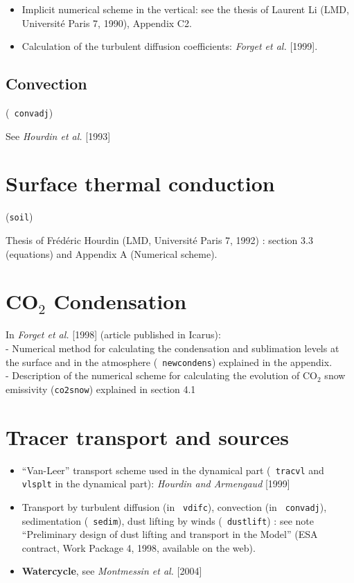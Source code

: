 \begin{itemize}
\item Implicit numerical scheme in the vertical:
see the thesis of Laurent Li (LMD, Universit\'e Paris 7, 1990), Appendix C2.

\item Calculation of the turbulent diffusion coefficients:
{\it Forget et al. } [1999].
\end{itemize}

\subsection{Convection}
 (\verb+ convadj+)

See {\it Hourdin et al.} [1993]
\nocite{Hour:93}

\section{Surface thermal conduction}
 (\verb+soil+)

Thesis of Fr\'ed\'eric Hourdin (LMD, Universit\'e Paris 7, 1992) :
 section 3.3 (equations) and Appendix A (Numerical scheme).

\section{CO$_2$ Condensation}

In {\it Forget et al.} [1998] (article published in Icarus): \\
- Numerical method for calculating the condensation and sublimation levels
at the surface and in the atmosphere (\verb+ newcondens+)
 explained in the appendix.
\\
- Description of the numerical scheme for calculating the evolution of CO$_2$
snow emissivity (\verb+co2snow+) explained in section 4.1
\nocite{Forg:98}

\section{Tracer transport and sources}
\begin{itemize}
\item ``Van-Leer'' transport scheme used in the dynamical part
(\verb+ tracvl+ and  \verb+ vlsplt+ in the dynamical part):
{\it Hourdin and Armengaud} [1999] \nocite{Hour:99}

\item Transport by turbulent diffusion  (in \verb+ vdifc+), convection
(in  \verb+ convadj+), sedimentation  (\verb+ sedim+),
dust lifting by winds (\verb+ dustlift+) :
see note ``Preliminary design of dust lifting and transport in the Model''
(ESA contract, Work Package 4, 1998, available on the web).


\item {\bf Watercycle}, see {\it Montmessin et al.} [2004]
\nocite{Mont:04jgr}

\end{itemize}


